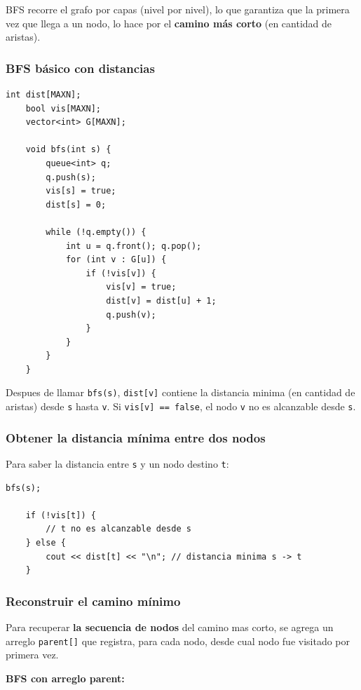 BFS recorre el grafo por capas (nivel por nivel), lo que garantiza que la primera vez que llega a un nodo, lo hace por el \textbf{camino más corto} (en cantidad de aristas).

\subsubsection*{BFS básico con distancias}

\begin{lstlisting}[caption=BFS con calculo de distancias]
	int dist[MAXN];
	bool vis[MAXN];
	vector<int> G[MAXN];
	
	void bfs(int s) {
		queue<int> q;
		q.push(s);
		vis[s] = true;
		dist[s] = 0;
		
		while (!q.empty()) {
			int u = q.front(); q.pop();
			for (int v : G[u]) {
				if (!vis[v]) {
					vis[v] = true;
					dist[v] = dist[u] + 1;
					q.push(v);
				}
			}
		}
	}
\end{lstlisting}

Despues de llamar \texttt{bfs(s)}, \texttt{dist[v]} contiene la distancia minima (en cantidad de aristas) desde \texttt{s} hasta \texttt{v}. Si \texttt{vis[v] == false}, el nodo \texttt{v} no es alcanzable desde \texttt{s}.

\subsubsection*{Obtener la distancia mínima entre dos nodos}

Para saber la distancia entre \texttt{s} y un nodo destino \texttt{t}:

\begin{lstlisting}[caption=Consultar distancia minima]
	bfs(s);
	
	if (!vis[t]) {
		// t no es alcanzable desde s
	} else {
		cout << dist[t] << "\n"; // distancia minima s -> t
	}
\end{lstlisting}

\subsubsection*{Reconstruir el camino mínimo}

Para recuperar \textbf{la secuencia de nodos} del camino mas corto, se agrega un arreglo \texttt{parent[]} que registra, para cada nodo, desde cual nodo fue visitado por primera vez.

\bigskip

\textbf{BFS con arreglo parent:}

